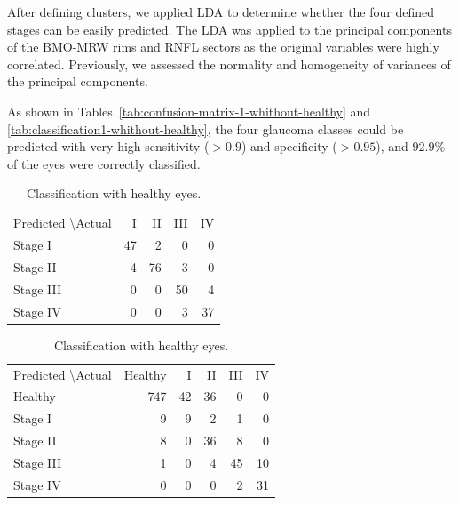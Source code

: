 \documentclass[jcm,article,submit,moreauthors,pdftex]{Definitions/mdpi}
\begin{document}
After defining clusters, we applied LDA to determine whether the four defined stages can be easily predicted. 
The LDA was applied to the principal components of the BMO-MRW rims and RNFL sectors as the original variables were highly correlated. Previously, we assessed the normality and homogeneity of variances of the principal components.

As shown in Tables~\ref{tab:confusion-matrix-1-whithout-healthy} and \ref{tab:classification1-whithout-healthy}, the four glaucoma classes could be predicted with very high sensitivity ($> 0.9$) and specificity ($> 0.95$), and $92.9\%$ of the eyes were correctly classified. 

\begin{table}[ht]
\caption{The confusion matrix of classification into glaucoma stages using LDA with all the variables.}
\label{tab:confusion-matrix-1}
\begin{subtable}[b]{0.5\textwidth}
\centering
\begin{tabular}{lrrrr}
\toprule

Predicted \textbackslash Actual & I & II & III & IV \\ 
Stage I &  47 &   2 &   0 &   0 \\ 
Stage II &   4 &  76 &   3 &   0 \\ 
Stage III &   0 &   0 &  50 &   4 \\ 
Stage IV &   0 &   0 &   3 &  37 \\ 
\bottomrule
\end{tabular}
\caption{Classification without healthy eyes.}
\label{tab:confusion-matrix-1-whithout-healthy}
\end{subtable}
\hfill
\begin{subtable}[b]{0.5\textwidth}
\centering
\begin{tabular}{lrrrrr}
\toprule
Predicted \textbackslash Actual & Healthy & I & II & III & IV \\ 
Healthy & 747 &  42 &  36 &   0 &   0 \\ 
Stage I &   9 &   9 &   2 &   1 &   0 \\ 
Stage II &   8 &   0 &  36 &   8 &   0 \\ 
Stage III &   1 &   0 &   4 &  45 &  10 \\ 
Stage IV &   0 &   0 &   0 &   2 &  31 \\ 
\bottomrule
\end{tabular}
\caption{Classification with healthy eyes.}
\label{tab:confusion-matrix-1-whith-healthy}
\end{subtable}
\end{table}
\end{document}
